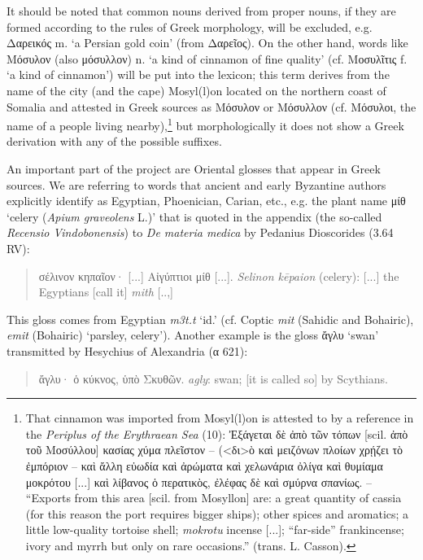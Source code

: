 \documentclass[output=paper,colorlinks,citecolor=brown,arabicfont,chinesefont]{langscibook}
\begin{document}
It should be noted that common nouns derived from proper nouns, if they are formed according to the rules of Greek morphology, will be excluded, e.g. Δαρεικός m. ‘a Persian gold coin’ (from Δαρεῖος). On the other hand, words like Μόσυλον (also μόσυλλον) n. ‘a kind of cinnamon of fine quality’ (cf. Μοσυλῖτις f. ‘a kind of cinnamon’) will be put into the lexicon; this term derives from the name of the city (and the cape) Mosyl(l)on located on the northern coast of Somalia and attested in Greek sources as Μόσυλον or Μόσυλλον (cf. Μόσυλοι, the name of a people living nearby),\footnote{That cinnamon was imported from Mosyl(l)on is attested to by a reference in the \emph{Periplus of the Erythraean Sea} (10): Ἐξάγεται δὲ ἀπὸ τῶν τόπων [scil. ἀπὸ τοῦ Μοσύλλου] κασίας χύμα πλεῖστον – (<δι>ὸ καὶ μειζόνων πλοίων χρῄζει τὸ ἐμπόριον – καὶ ἄλλη εὐωδία καὶ ἀρώματα καὶ χελωνάρια ὀλίγα καὶ θυμίαμα μοκρότου [...] καὶ λίβανος ὁ περατικὸς, ἐλέφας δὲ καὶ σμύρνα σπανίως. – “Exports from this area [scil. from Mosyllon] are: a great quantity of cassia (for this reason the port requires bigger ships); other spices and aromatics; a little low-quality tortoise shell; \emph{mokrotu} incense [...]; “far-side” frankincense; ivory and myrrh but only on rare occasions.” (trans. L.  Casson).}  but morphologically it does not show a Greek derivation with any of the possible suffixes.

An important part of the project are Oriental glosses that appear in Greek sources. We are referring to words that ancient and early Byzantine authors explicitly identify as Egyptian, Phoenician, Carian, etc., e.g. the plant name μίθ ‘celery (\emph{Apium graveolens} L.)’ that is quoted in the appendix (the so-called \emph{Recensio Vindobonensis}) to \emph{De materia medica} by Pedanius Dioscorides (3.64 RV):

\begin{quote}
    σέλινον κηπαῖον· [...] Αἰγύπτιοι μίθ [...].
    \newline
    \emph{Selinon kēpaion} (celery): [...] the Egyptians [call it] \emph{mith} [..,]
\end{quote}

This gloss comes from Egyptian \emph{m3t.t} ‘id.’ (cf. Coptic \emph{mit} (Sahidic and Bohairic), \emph{emit} (Bohairic) ‘parsley, celery’). Another example is the gloss ἄγλυ ‘swan’ transmitted by Hesychius of Alexandria (α 621): 

\begin{quote}
    ἄγλυ· ὁ κύκνος, ὑπὸ Σκυθῶν.
    \newline
    \emph{agly}: swan; [it is called so] by Scythians. 
\end{quote}
\end{document}
